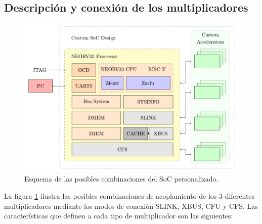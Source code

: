 \subsection{Descripción y conexión de los multiplicadores}

\label{decrip}


\begin{figure}[h!]
    \centering
    \includegraphics[width=14cm]{Figuras/scheme.pdf}
    \caption{Esquema de las posibles combinaciones del SoC personalizado.}
    \label{fig:soc}
\end{figure}

La figura \ref{fig:soc} ilustra las posibles combinaciones de acoplamiento de los 3 diferentes multiplicadores mediante los modos de conexión SLINK, XBUS, CFU y CFS.
Las características que definen a cada tipo de multiplicador son las siguientes:


